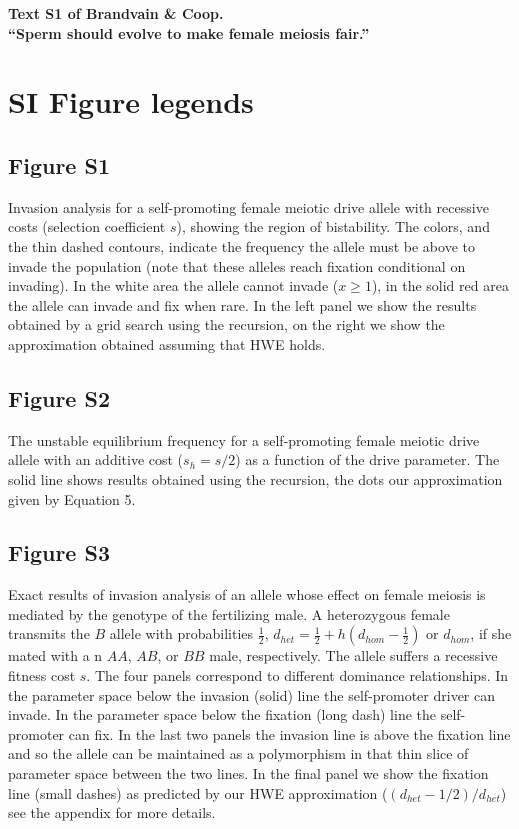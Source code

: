 \documentclass[12pt,letterpaper]{article}
\begin{document}
 
\begin{center}
\Large{{\bf{Text S1 of Brandvain \& Coop. \\ ``Sperm should evolve to make female meiosis fair.''}}}
\end{center}

\section*{SI Figure legends}
\subsection*{Figure S1}
Invasion analysis for a self-promoting female meiotic drive allele with
  recessive costs (selection coefficient $s$), showing the region of
  bistability. The colors, and the thin dashed contours, indicate the
  frequency the allele must be above to invade the population (note
  that these alleles reach fixation conditional on invading). In the
  white area the allele cannot invade ($x \geq1$), in the solid red
  area the allele can invade and fix when rare. In the left panel we
  show the results obtained by a grid search using the recursion, on
  the right we show the approximation obtained assuming that HWE
  holds.
  
\subsection*{Figure S2}
The unstable equilibrium frequency for a self-promoting
  female meiotic drive allele with an additive cost ($s_h=s/2$) as a
  function of the drive parameter. The solid line shows results
  obtained using the recursion, the dots our approximation given by Equation 5.

\subsection*{Figure S3}
Exact results of invasion analysis of an allele whose effect
 on female meiosis is mediated by the genotype of the fertilizing
 male.  
 A heterozygous female transmits the $B$ allele 
  with probabilities  $\frac{1}{2}$,  $d_{het}=\frac{1}{2} + h(d_{hom}-\frac{1}{2}) $ or $d_{hom}$, 
 if she mated with a n $AA$, $AB$, or $BB$ male,  respectively.  
 The allele suffers a recessive fitness cost $s$.  
 The four panels correspond to different dominance relationships.
In the parameter space below the invasion (solid) line the self-promoter
 driver can invade. In the parameter space below the fixation (long
 dash) line the self-promoter can fix. In the last
 two panels the invasion line is above the fixation line and so the
 allele can be maintained as a polymorphism in that thin slice of
 parameter space between the two lines. 
 In the final panel we show the
  fixation line (small dashes) as predicted by our HWE approximation
  ($(d_{het}-1/2)/d_{het}$) see the appendix for more details.
\end{document}
